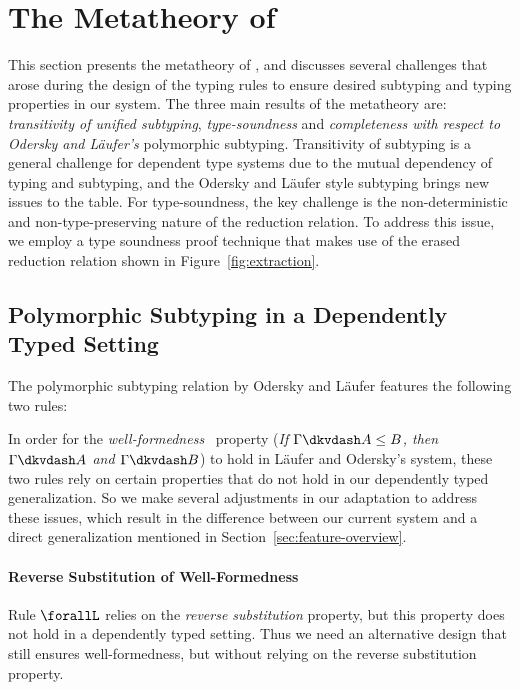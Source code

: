 \section{The Metatheory of \name}
\label{sec:metatheory}

This section presents the metatheory of \name, and discusses several challenges
that arose during the design of the typing rules to ensure desired subtyping and
typing properties in our system.
The three main results of the metatheory are:
\emph{transitivity of unified subtyping}, \emph{type-soundness} and
\emph{completeness with respect to Odersky and L\"aufer's} polymorphic
subtyping. Transitivity of subtyping is a general challenge for dependent type systems due
to the mutual dependency of typing and subtyping, and the Odersky and L\"aufer style
subtyping brings new issues to the table. For type-soundness, the key challenge
is the non-deterministic and non-type-preserving nature of the reduction relation.
To address this issue, we employ a type soundness proof technique
that makes use of the erased reduction relation shown in Figure~\ref{fig:extraction}.

\subsection{Polymorphic Subtyping in a Dependently Typed Setting}
\label{sec:adaptation}

The polymorphic subtyping relation by Odersky and L\"aufer features the following two rules:
In order for the \emph{well-formedness}~\citep{dunfield2013lemmas} property
(\emph{If $\Gamma \dkvdash A \le B$, then $\Gamma \dkvdash A$ and $\Gamma \dkvdash B$})
to hold in L\"aufer and Odersky's system, these two rules rely on certain properties
that do not hold in our dependently typed generalization. So we make several adjustments
in our adaptation to address these issues, which result in the difference between
our current system and a direct generalization mentioned in Section~\ref{sec:feature-overview}.

\paragraph*{Reverse Substitution of Well-Formedness}
\label{sec:reverse-subst}
Rule $\forallL$ relies on the \emph{reverse substitution} property, but this property
does not hold in a dependently typed setting. Thus we need an alternative design that
still ensures well-formedness, but without relying on the reverse substitution property.

